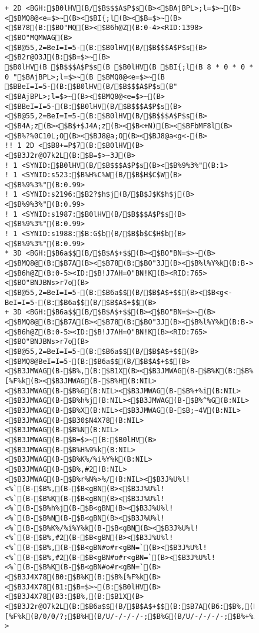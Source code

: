 \documentclass[a4j]{jarticle}
\begin{document}
{{{{\begin{figure}[t]
\begin{center}
\begin{minipage}{\hsize}
\begin{verbatim}
+ 2D <BGH:$B0lHV(B/$B$$$A$P$s(B><$BAjBPL>;l=$>~(B><$BMQ8@<e=$>~(B><$BI{;l(B><$B=$>~(B><$B78(B:$BO"MQ(B><$B6h@Z(B:0-4><RID:1398><$BO"MQMWAG(B><$B@55,2=BeI=I=5-(B:$B0lHV(B/$B$$$A$P$s(B><$B2r@O3J(B:$B=$>~(B>
$B0lHV(B $B$$$A$P$s(B $B0lHV(B $BI{;l(B 8 * 0 * 0 * 0 "$BAjBPL>;l=$>~(B $BMQ8@<e=$>~(B $BBeI=I=5-(B:$B0lHV(B/$B$$$A$P$s(B" <$BAjBPL>;l=$>~(B><$BMQ8@<e=$>~(B><$BBeI=I=5-(B:$B0lHV(B/$B$$$A$P$s(B><$B@55,2=BeI=I=5-(B:$B0lHV(B/$B$$$A$P$s(B><$B4A;z(B><$B$+$J4A;z(B><$B<+N)(B><$BFbMF8l(B><$B%?%0C10L;O(B><$BJ8@a;O(B><$BJ8@a<g<-(B>
!! 1 2D <$B8+=P$7(B:$B0lHV(B><$B3J2r@O7k2L(B:$B=$>~3J(B>
! 1 <SYNID:$B0lHV(B/$B$$$A$P$s(B><$B%9%3%"(B:1>
! 1 <SYNID:s523:$B%H%C%W(B/$B$H$C$W(B><$B%9%3%"(B:0.99>
! 1 <SYNID:s2196:$B2?$h$j(B/$B$J$K$h$j(B><$B%9%3%"(B:0.99>
! 1 <SYNID:s1987:$B0lHV(B/$B$$$A$P$s(B><$B%9%3%"(B:0.99>
! 1 <SYNID:s1988:$B:G$b(B/$B$b$C$H$b(B><$B%9%3%"(B:0.99>
* 3D <BGH:$B6a$$(B/$B$A$+$$(B><$BO"BN=$>~(B><$BMQ8@(B:$B7A(B><$B78(B:$BO"3J(B><$B%l%Y%k(B:B-><$B6h@Z(B:0-5><ID:$B!J7AH=O"BN!K(B><RID:765><$BO"BNJBNs>r7o(B><$B@55,2=BeI=I=5-(B:$B6a$$(B/$B$A$+$$(B><$B<g<-BeI=I=5-(B:$B6a$$(B/$B$A$+$$(B>
+ 3D <BGH:$B6a$$(B/$B$A$+$$(B><$BO"BN=$>~(B><$BMQ8@(B:$B7A(B><$B78(B:$BO"3J(B><$B%l%Y%k(B:B-><$B6h@Z(B:0-5><ID:$B!J7AH=O"BN!K(B><RID:765><$BO"BNJBNs>r7o(B><$B@55,2=BeI=I=5-(B:$B6a$$(B/$B$A$+$$(B><$BMQ8@BeI=I=5-(B:$B6a$$(B/$B$A$+$$(B><$B3JMWAG(B-$B%,(B:$B1X(B><$B3JMWAG(B-$B%K(B:$B%[%F%k(B><$B3JMWAG(B-$B%H(B:NIL><$B3JMWAG(B-$B%G(B:NIL><$B3JMWAG(B-$B%+%i(B:NIL><$B3JMWAG(B-$B%h%j(B:NIL><$B3JMWAG(B-$B%^%G(B:NIL><$B3JMWAG(B-$B%X(B:NIL><$B3JMWAG(B-$B;~4V(B:NIL><$B3JMWAG(B-$B30$N4X78(B:NIL><$B3JMWAG(B-$B%N(B:NIL><$B3JMWAG(B-$B=$>~(B:$B0lHV(B><$B3JMWAG(B-$B%H%9%k(B:NIL><$B3JMWAG(B-$B%K%/%i%Y%k(B:NIL><$B3JMWAG(B-$B%,#2(B:NIL><$B3JMWAG(B-$B%r%N%>%/(B:NIL><$B3J%U%l!<%`(B-$B%,(B-$B<gBN(B><$B3J%U%l!<%`(B-$B%K(B-$B<gBN(B><$B3J%U%l!<%`(B-$B%h%j(B-$B<gBN(B><$B3J%U%l!<%`(B-$B%N(B-$B<gBN(B><$B3J%U%l!<%`(B-$B%K%/%i%Y%k(B-$B<gBN(B><$B3J%U%l!<%`(B-$B%,#2(B-$B<gBN(B><$B3J%U%l!<%`(B-$B%,(B-$B<gBN#o#r<gBN=`(B><$B3J%U%l!<%`(B-$B%,#2(B-$B<gBN#o#r<gBN=`(B><$B3J%U%l!<%`(B-$B%K(B-$B<gBN#o#r<gBN=`(B><$B3J4X78(B0:$B%K(B:$B%[%F%k(B><$B3J4X78(B1:$B=$>~(B:$B0lHV(B><$B3J4X78(B3:$B%,(B:$B1X(B><$B3J2r@O7k2L(B:$B6a$$(B/$B$A$+$$(B:$B7A(B6:$B%,(B/N/$B1X(B/3/0/?;$B%K(B/C/$B%[%F%k(B/0/0/?;$B%H(B/U/-/-/-/-;$B%G(B/U/-/-/-/-;$B%+%i(B/U/-/-/-/-;$B%h%j(B/U/-/-/-/-;$B%^%G(B/U/-/-/-/-;$B%X(B/U/-/-/-/-;$B;~4V(B/U/-/-/-/-;$B30$N4X78(B/U/-/-/-/-;$B%N(B/U/-/-/-/-;$B=$>~(B/C/$B0lHV(B/1/0/?;$B%H%9%k(B/U/-/-/-/-;$B%K%/%i%Y%k(B/U/-/-/-/-;$B%,#2(B/U/-/-/-/-;$B%r%N%>%/(B/U/-/-/-/->

\end{verbatim}
\end{minipage}
\end{center}
\end{figure}}}}}
\end{document}
